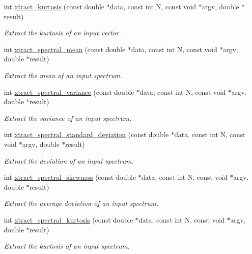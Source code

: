 \begin{DoxyCompactItemize}
int \hyperlink{group__scalar_gab3c2ed87334863c1ec1b715a025d29bf}{xtract\-\_\-kurtosis} (const double $\ast$data, const int N, const void $\ast$argv, double $\ast$result)
\begin{DoxyCompactList}\small\item\em Extract the kurtosis of an input vector. \end{DoxyCompactList}\item 
int \hyperlink{group__scalar_gaef94b4c5a6aa30371ba139aeec12171d}{xtract\-\_\-spectral\-\_\-mean} (const double $\ast$data, const int N, const void $\ast$argv, double $\ast$result)
\begin{DoxyCompactList}\small\item\em Extract the mean of an input spectrum. \end{DoxyCompactList}\item 
int \hyperlink{group__scalar_gae7cf2a81adf731b68764fd9231cfdeca}{xtract\-\_\-spectral\-\_\-variance} (const double $\ast$data, const int N, const void $\ast$argv, double $\ast$result)
\begin{DoxyCompactList}\small\item\em Extract the variance of an input spectrum. \end{DoxyCompactList}\item 
int \hyperlink{group__scalar_ga0fead79c37adc58ed18cb144b0ae7689}{xtract\-\_\-spectral\-\_\-standard\-\_\-deviation} (const double $\ast$data, const int N, const void $\ast$argv, double $\ast$result)
\begin{DoxyCompactList}\small\item\em Extract the deviation of an input spectrum. \end{DoxyCompactList}\item 
int \hyperlink{group__scalar_gaeeeb79e2ea6070d4f9aa99e0ee53c141}{xtract\-\_\-spectral\-\_\-skewness} (const double $\ast$data, const int N, const void $\ast$argv, double $\ast$result)
\begin{DoxyCompactList}\small\item\em Extract the average deviation of an input spectrum. \end{DoxyCompactList}\item 
int \hyperlink{group__scalar_ga243de78d04e3d69d35dac66f304d0bf0}{xtract\-\_\-spectral\-\_\-kurtosis} (const double $\ast$data, const int N, const void $\ast$argv, double $\ast$result)
\begin{DoxyCompactList}\small\item\em Extract the kurtosis of an input spectrum. \end{DoxyCompactList}\item 

\end{DoxyCompactItemize}

